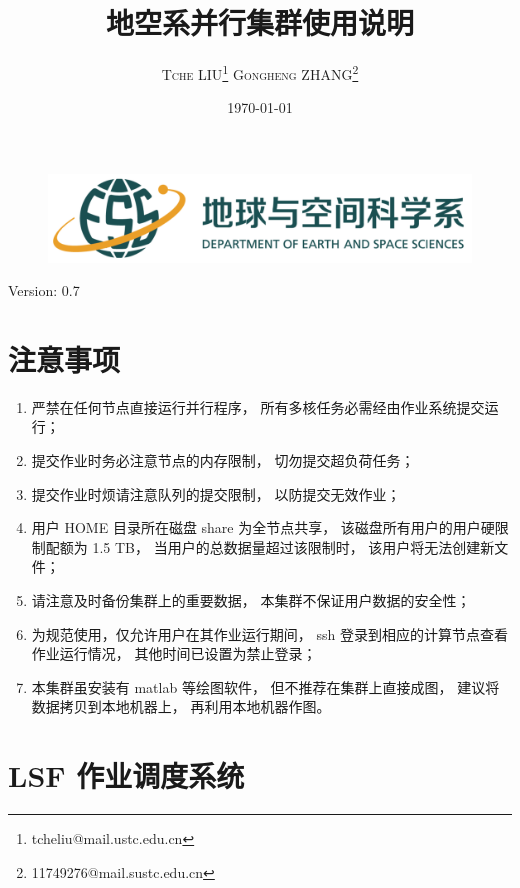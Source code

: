 \documentclass[UTF8]{ctexart}
\title{\vspace{10mm}\heiti\huge 地空系并行集群使用说明\vspace{30mm}}
\author{\LARGE\textsc{Tche LIU}\thanks{tcheliu@mail.ustc.edu.cn}\hspace{10mm}
\textsc{Gongheng ZHANG}\thanks{11749276@mail.sustc.edu.cn}
\vspace{10mm}}
\date{\today}
\begin{document}
\begin{figure}[t]
  \centering
  \includegraphics[width=125mm]{material/esslogo.png}
\end{figure}
\maketitle
\centerline{Version: 0.7}
\newpage

\tableofcontents
\newpage

\section{注意事项}
\begin{enumerate}[\hspace{15mm}（1）]
  \item 严禁在任何节点直接运行并行程序，
    所有多核任务必需经由作业系统提交运行；
  \item 提交作业时务必注意节点的内存限制，
    切勿提交超负荷任务；
  \item 提交作业时烦请注意队列的提交限制，
    以防提交无效作业；
  \item 用户 HOME 目录所在磁盘 share 为全节点共享，
    该磁盘所有用户的用户硬限制配额为 1.5 TB，
    当用户的总数据量超过该限制时，
    该用户将无法创建新文件；
  \item 请注意及时备份集群上的重要数据，
    本集群不保证用户数据的安全性；
  \item 为规范使用，仅允许用户在其作业运行期间，
    ssh 登录到相应的计算节点查看作业运行情况，
    其他时间已设置为禁止登录；
  \item 本集群虽安装有 matlab 等绘图软件，
    但不推荐在集群上直接成图，
    建议将数据拷贝到本地机器上，
    再利用本地机器作图。
\end{enumerate}

\section{LSF 作业调度系统}
\end{document}
